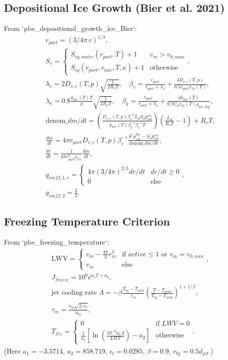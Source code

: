 \documentclass{article}
\begin{document}
\subsection*{Depositional Ice Growth (Bier et al. 2021)}
From `pbe_depositional_growth_ice_Bier`:
\begin{align}
&r_{part} = (3/4\pi\,v)^{1/3},\\
&S_v = \begin{cases}S_{eq,water}(r_{part},T)+1 & v_m>v_{0,max}\\ S_{eq}(r_{part},r_{nuc},T,\kappa)+1 & \text{otherwise}\end{cases},\\
&\lambda_v = 2 D_{v,c}(T,p)\sqrt{\frac{1}{2R_v T}},
\quad \beta_v = \frac{r_{part}}{r_{part}+\lambda_v}+\frac{4 D_{v,c}(T,p)}{0.5 r_{part} v_{th}(T)},\\
&\lambda_a = 0.8\frac{k_{air}(T)T}{p}\sqrt{\frac{1}{2R_a T}},
\quad \beta_k = \frac{r_{part}}{r_{part}+\lambda_a}+\frac{4 k_{air}(T)}{0.7 C_p v_{th}(T) \rho_{air,dry}},\\
&\text{denom}\_{dm/dt} = \left( \frac{D_{v,c}(T,p)\beta_v^{-1}L_d S_v p_{sat}^{ice}}{k_{air}(T)\beta_k^{-1}\beta_v^{-1}T}\right)
\left(\frac{L_d}{R_v T}-1\right) + R_v T,\\
&\frac{dm}{dt} = 4\pi r_{part}
D_{v,c}(T,p)\beta_v^{-1}\frac{S^*p_{sat}^{liq}-S_v p_{sat}^{ice}}{\text{denom}\_{dm/dt}},\\
&\frac{dr}{dt} = \frac{1}{4\pi r_{part}^2 \rho_{ice}}\frac{dm}{dt},\\
&g_{coeff,1,r} = \begin{cases}4\pi (3/4\pi)^{2/3} dr/dt & dr/dt\ge0\\0&\text{else}\end{cases},
\\
&g_{coeff,2} = \frac{2}{3}.
\end{align}

\subsection*{Freezing Temperature Criterion}
From `pbe_freezing_temperature`:
\begin{align}
&\text{LWV} =
\begin{cases}v_m - \frac{4\pi}{3}r_{vc}^3 & \text{if } active\le1\text{ or }v_m=v_{0,min}\\ v_m & \text{else}\end{cases},\\
&J_{freeze} = 10^{6} e^{a_1 T + a_2},\\
&\text{jet cooling rate }\Lambda = -\beta \frac{T_{0j}-T_{amb}}{\tau_m} \left(\frac{T-T_{amb}}{T_{0j}-T_{amb}}\right)^{1+1/\beta},\\
&\tau_m = \frac{r_{0j}\sqrt{2/\epsilon_t}}{u_{0j}},\\
&T_{frz} = \begin{cases}0 & \text{if } LWV=0\\ \frac{1}{a_1}\left[\ln\left(\frac{10^{-6}a_1 \Lambda}{LWV}\right)-a_2\right]&\text{otherwise}\end{cases}.
\end{align}
(Here $a_1=-3.5714$, $a_2=858.719$, $\epsilon_t=0.0285$, $\beta=0.9$,
$r_{0j}=0.5 d_{jet}$.)
\end{document}
